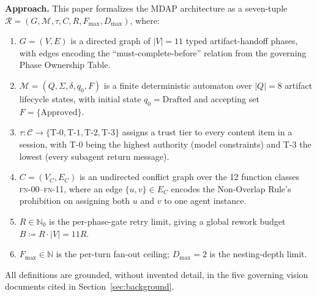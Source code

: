 \documentclass[12pt]{article}
\theoremstyle{definition}
\newcommand{\FN}[1]{\textsc{fn-#1}}
\begin{document}
\medskip
\noindent
\textbf{Approach.}
This paper formalizes the MDAP architecture as a seven-tuple
$\mathcal{R} = (G, \mathcal{M}, \tau, C, R, F_{\max}, D_{\max})$,
where:
\begin{enumerate}
    \item[(A1)] $G = (V, E)$ is a directed graph of $|V|=11$ typed
          artifact-handoff phases, with edges encoding the
          ``must-complete-before'' relation from the governing Phase
          Ownership Table.
    \item[(A2)] $\mathcal{M} = (Q, \Sigma, \delta, q_0, F)$ is a
          finite deterministic automaton over $|Q|=8$ artifact
          lifecycle states, with initial state
          $q_0 = \mathrm{Drafted}$ and accepting set
          $F = \{\mathrm{Approved}\}$.
    \item[(A3)] $\tau : \mathcal{C} \to
          \{\mathrm{T\text{-}0}, \mathrm{T\text{-}1},
          \mathrm{T\text{-}2}, \mathrm{T\text{-}3}\}$ assigns a
          trust tier to every content item in a session, with T-0
          being the highest authority (model constraints) and T-3
          the lowest (every subagent return message).
    \item[(A4)] $C = (V_C, E_C)$ is an undirected conflict graph over
          the 12 function classes \FN{00}--\FN{11}, where an edge
          $\{u,v\} \in E_C$ encodes the Non-Overlap Rule's prohibition
          on assigning both $u$ and $v$ to one agent instance.
    \item[(A5)] $R \in \mathbb{N}_0$ is the per-phase-gate retry
          limit, giving a global rework budget
          $B \coloneqq R \cdot |V| = 11R$.
    \item[(A6)] $F_{\max} \in \mathbb{N}$ is the per-turn fan-out
          ceiling; $D_{\max} = 2$ is the nesting-depth limit.
\end{enumerate}
All definitions are grounded, without invented detail, in the five
governing vision documents cited in Section~\ref{sec:background}.
\end{document}
